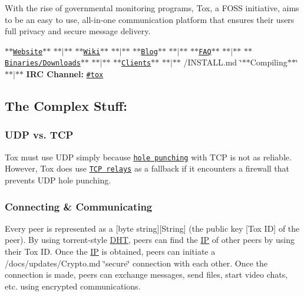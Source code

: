  



With the rise of governmental monitoring programs, Tox, a F\+O\+S\+S initiative, aims to be an easy to use, all-\/in-\/one communication platform that ensures their users full privacy and secure message delivery.~\newline
 ~\newline


\href{https://tox.chat}{\tt $\ast$$\ast$\+Website$\ast$$\ast$} $\ast$$\ast$$\vert$$\ast$$\ast$ \href{https://wiki.tox.chat/}{\tt $\ast$$\ast$\+Wiki$\ast$$\ast$} $\ast$$\ast$$\vert$$\ast$$\ast$ \href{https://blog.tox.chat/}{\tt $\ast$$\ast$\+Blog$\ast$$\ast$} $\ast$$\ast$$\vert$$\ast$$\ast$ \href{https://wiki.tox.chat/doku.php?id=users:faq}{\tt $\ast$$\ast$\+F\+A\+Q$\ast$$\ast$} $\ast$$\ast$$\vert$$\ast$$\ast$ \href{https://wiki.tox.chat/Binaries}{\tt $\ast$$\ast$\+Binaries/\+Downloads$\ast$$\ast$} $\ast$$\ast$$\vert$$\ast$$\ast$ \href{https://wiki.tox.chat/doku.php?id=clients}{\tt $\ast$$\ast$\+Clients$\ast$$\ast$} $\ast$$\ast$$\vert$$\ast$$\ast$ /\+I\+N\+S\+T\+A\+L\+L.md \char`\"{}$\ast$$\ast$\+Compiling$\ast$$\ast$\char`\"{} $\ast$$\ast$$\vert$$\ast$$\ast$ {\bfseries I\+R\+C Channel\+:} \href{https://webchat.freenode.net/?channels=tox}{\tt \#tox}

\subsection*{The Complex Stuff\+:}

\subsubsection*{U\+D\+P vs. T\+C\+P}

Tox must use U\+D\+P simply because \href{https://en.wikipedia.org/wiki/UDP_hole_punching}{\tt hole punching} with T\+C\+P is not as reliable. However, Tox does use \href{/docs/TCP_Network.txt}{\tt T\+C\+P relays} as a fallback if it encounters a firewall that prevents U\+D\+P hole punching.

\subsubsection*{Connecting \& Communicating}

Every peer is represented as a \mbox{[}byte string\mbox{]}\mbox{[}String\mbox{]} (the public key \mbox{[}Tox I\+D\mbox{]} of the peer). By using torrent-\/style \hyperlink{struct_d_h_t}{D\+H\+T}, peers can find the \hyperlink{struct_i_p}{I\+P} of other peers by using their Tox I\+D. Once the \hyperlink{struct_i_p}{I\+P} is obtained, peers can initiate a /docs/updates/\+Crypto.md \char`\"{}secure\char`\"{} connection with each other. Once the connection is made, peers can exchange messages, send files, start video chats, etc. using encrypted communications.


